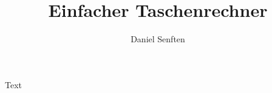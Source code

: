 \documentclass{manual}
\title{Einfacher Taschenrechner}
\author{Daniel Senften}
\begin{document}
Text


\end{document}
